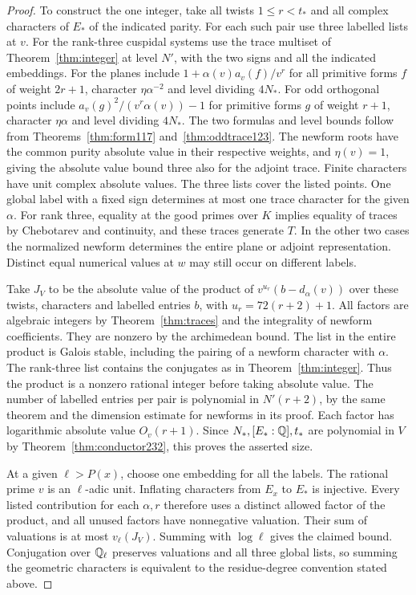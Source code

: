 \documentclass[a4paper,11pt]{article}
\theoremstyle{definition}
\theoremstyle{remark}
\numberwithin{equation}{section}
\begin{document}
\begin{proof}
To construct the one integer, take all twists \(1\le r<t_*\)
and all complex characters of \(E_*\) of the indicated parity.
For each such pair use three labelled lists at \(v\). For the
rank-three cuspidal systems use the trace multiset of
Theorem~\ref{thm:integer} at level \(N'\), with the two signs
and all the indicated embeddings. For the planes include
\(1+\alpha(v)a_v(f)/v^r\) for all primitive forms \(f\) of
weight \(2r+1\), character \(\eta\alpha^{-2}\) and level dividing
\(4N_*\). For odd orthogonal points include
\(a_v(g)^2/(v^r\alpha(v))-1\) for primitive forms \(g\) of
weight \(r+1\), character \(\eta\alpha\) and level dividing
\(4N_*\). The two formulas and level bounds follow from
Theorems~\ref{thm:form117} and~\ref{thm:oddtrace123}.
The newform roots have the common purity absolute value in their
respective weights, and \(\eta(v)=1\), giving the absolute value
bound three also for the adjoint trace. Finite characters have
unit complex absolute values. The three lists cover the listed
points. One global label with a fixed sign determines at most
one trace character for the given \(\alpha\). For rank three,
equality at the good primes over \(K\) implies equality of
traces by Chebotarev and continuity, and these traces generate
\(T\). In the other two cases the normalized newform determines
the entire plane or adjoint representation. Distinct equal
numerical values at \(w\) may still occur on different labels.

Take \(J_V\) to be the absolute value of the product of
\(v^{u_r}(b-d_\alpha(v))\) over these twists, characters and
labelled entries \(b\), with \(u_r=72(r+2)+1\). All factors
are algebraic integers by Theorem~\ref{thm:traces} and the
integrality of newform coefficients. They are nonzero by the
archimedean bound. The list in the entire product is Galois
stable, including the pairing of a newform character with
\(\alpha\). The rank-three list contains the conjugates as in
Theorem~\ref{thm:integer}. Thus the product is a nonzero rational
integer before taking absolute value. The number of labelled
entries per pair is polynomial in \(N'(r+2)\), by the same
theorem and the dimension estimate for newforms in its proof.
Each factor has logarithmic absolute value \(O_v(r+1)\). Since
\(N_*,[E_*:\mathbb Q],t_*\) are polynomial in \(V\) by
Theorem~\ref{thm:conductor232}, this proves the asserted size.

At a given \(\ell>P(x)\), choose one embedding for all the
labels. The rational prime \(v\) is an \(\ell\)-adic unit.
Inflating characters from \(E_x\) to \(E_*\) is injective.
Every listed contribution for each \(\alpha,r\) therefore uses
a distinct allowed factor of the product, and all unused factors
have nonnegative valuation. Their sum of valuations is at most
\(v_\ell(J_V)\). Summing with \(\log\ell\) gives the claimed
bound. Conjugation over \(\mathbb Q_\ell\) preserves valuations and
all three global lists, so summing the geometric characters is
equivalent to the residue-degree convention stated above.
\end{proof}
\end{document}

